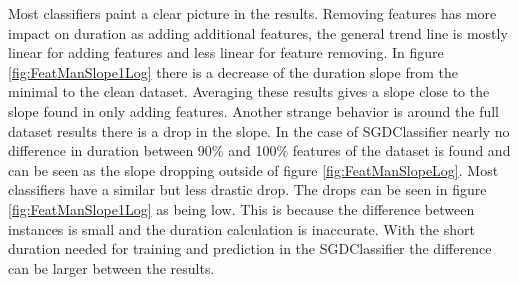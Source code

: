 \documentclass[a4paper,10pt]{article}
\begin{document}
Most classifiers paint a clear picture in the results. Removing features has more impact on duration as adding additional features, the general trend line is mostly linear for adding features and less linear for feature removing. In figure \ref{fig:FeatManSlope1Log} there is a decrease of the duration slope from the minimal to the clean dataset. Averaging these results gives a slope close to the slope found in only adding features. Another strange behavior is around the full dataset results there is a drop in the slope. In the case of SGDClassifier nearly no difference in duration between 90$\%$ and 100$\%$ features of the dataset is found and can be seen as the slope dropping outside of figure \ref{fig:FeatManSlopeLog}. Most classifiers have a similar but less drastic drop. The drops can be seen in figure \ref{fig:FeatManSlope1Log} as being low. This is because the difference between instances is small and the duration calculation  is inaccurate. With the short duration needed for training and prediction in the SGDClassifier the difference can be larger between the results. 
\end{document}
